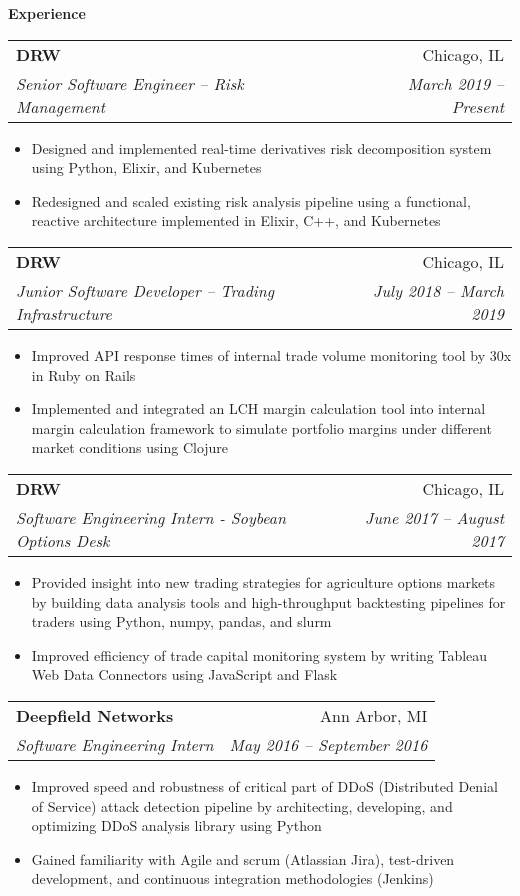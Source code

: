 \documentclass[letterpaper,11pt]{article}
\makeatletter
\newcommand{\resitem}[1]{\item #1 \vspace{-2pt}}
\newcommand{\resheading}[1]{{\large \colorbox{mygrey}{\begin{minipage}{\textwidth}{\textbf{#1 \vphantom{p\^{E}}}}\end{minipage}}}}
\newcommand{\ressubheading}[4]{
\begin{tabular*}{6.875in}{l@{\extracolsep{\fill}}r}
		\textbf{#1} & #2 \\
		\textit{#3} & \textit{#4} \\
\end{tabular*}\vspace{-6pt}}
\renewcommand{\footnotesize}{\fontsize{10pt}{11pt}\selectfont}
\makeatother
\begin{document}
		\resheading{Experience}
		\begin{description}
			\item
			\ressubheading{DRW}{Chicago, IL}
			{Senior Software Engineer -- Risk Management}{March 2019 -- Present}
			{	
				\footnotesize
				\begin{itemize}
					\resitem{Designed and implemented real-time derivatives risk decomposition system using Python, Elixir, and Kubernetes}
					\resitem{Redesigned and scaled existing risk analysis pipeline using a functional, reactive architecture implemented in Elixir, C++, and Kubernetes}
				\end{itemize}
			}
			\item
			\ressubheading{DRW}{Chicago, IL}
			{Junior Software Developer -- Trading Infrastructure}{July 2018 -- March 2019}
			{	
				\footnotesize
				\begin{itemize}
					\resitem{Improved API response times of internal trade volume monitoring tool by 30x in Ruby on Rails}
					\resitem{Implemented and integrated an LCH margin calculation tool into internal margin calculation framework to simulate portfolio margins under different market conditions using Clojure}
				\end{itemize}
			}
			\item 
			\ressubheading{DRW}{Chicago, IL}
			{Software Engineering Intern - Soybean Options Desk}{June 2017 -- August 2017}
			{	
				\footnotesize
				\begin{itemize}
					\resitem{Provided insight into new trading strategies for agriculture options markets by building data analysis tools and high-throughput backtesting pipelines for traders using Python, numpy, pandas, and slurm}
					\resitem{Improved efficiency of trade capital monitoring system by writing Tableau Web Data Connectors using JavaScript and Flask}
				\end{itemize}
			}
			\item 
			\ressubheading{Deepfield Networks}{Ann Arbor, MI}
			{Software Engineering Intern}{May 2016 -- September 2016}
			{	
				\footnotesize
				\begin{itemize}
					\resitem{Improved speed and robustness of critical part of DDoS (Distributed Denial of Service) attack detection pipeline by architecting, developing, and optimizing DDoS analysis library using Python}
					\resitem{Gained familiarity with Agile and scrum (Atlassian Jira), test-driven development, and continuous integration methodologies (Jenkins)}
				\end{itemize}
			}						
		\end{description}  %
						
\end{document}

